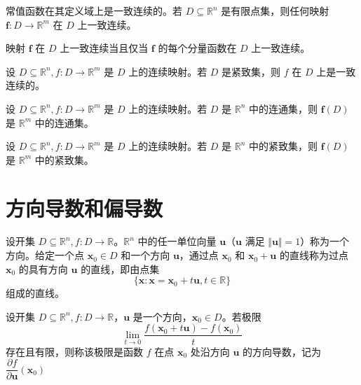 \begin{remark}
    常值函数在其定义域上是一致连续的。若 $D \subseteq \mathbb{R}^n$ 是有限点集，则任何映射 $\bm{f}: D \to \mathbb{R}^m$ 在 $D$ 上一致连续。
\end{remark}

\begin{remark}
    映射 $\bm{f}$ 在 $D$ 上一致连续当且仅当 $\bm{f}$ 的每个分量函数在 $D$ 上一致连续。
\end{remark}

\begin{theorem}
    设 $D \subseteq \mathbb{R}^n, f: D \to \mathbb{R}^m$ 是 $D$ 上的连续映射。若 $D$ 是紧致集，则 $f$ 在 $D$ 上是一致连续的。
\end{theorem}

\begin{theorem}
    设 $D \subseteq \mathbb{R}^n, f: D \to \mathbb{R}^m$ 是 $D$ 上的连续映射。若 $D$ 是 $\mathbb{R}^n$ 中的连通集，则 $\bm{f}(D)$ 是 $\mathbb{R}^m$ 中的连通集。
\end{theorem}

\begin{theorem}
    设 $D \subseteq \mathbb{R}^n, f: D \to \mathbb{R}^m$ 是 $D$ 上的连续映射。若 $D$ 是 $\mathbb{R}^n$ 中的紧致集，则 $\bm{f}(D)$ 是 $\mathbb{R}^m$ 中的紧致集。
\end{theorem}


\section{方向导数和偏导数}

\begin{definition}
    设开集 $D \subseteq \mathbb{R}^n, f: D \to \mathbb{R}$。$\mathbb{R}^n$ 中的任一单位向量 $\bm{u}$（$\bm{u}$ 满足 $\Vert \bm{u} \Vert = 1$）称为一个方向。给定一个点 $\bm{x}_0 \in D$ 和一个方向 $\bm{u}$，通过点 $\bm{x}_0$ 和 $\bm{x}_0 + \bm{u}$ 的直线称为过点 $\bm{x}_0$ 的具有方向 $\bm{u}$ 的直线，即由点集
    \[
        \{\bm{x}: \bm{x} = \bm{x}_0 + t \bm{u}, t \in \mathbb{R}\}
    \]
    组成的直线。
\end{definition}

\begin{definition}
    设开集 $D \subseteq \mathbb{R}^n, f: D \to \mathbb{R}$，$\bm{u}$ 是一个方向，$\bm{x}_0 \in D$。若极限
    \[
        \lim_{t \to 0}\frac{f(\bm{x}_0 + t \bm{u}) - f(\bm{x}_0)}{t}
    \]
    存在且有限，则称该极限是函数 $f$ 在点 $\bm{x}_0$ 处沿方向 $\bm{u}$ 的方向导数，记为 $\dfrac{\partial f}{\partial \bm{u}}(\bm{x}_0)$
\end{definition}

